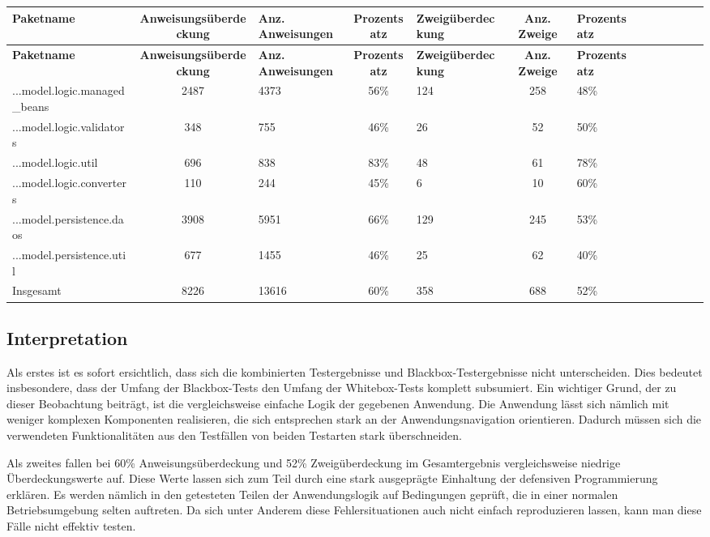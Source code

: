 \documentclass{article}
\begin{document}
\begin{longtable}{@{}lclclclclclcl@{}}
\toprule
\textbf{Paketname} & \textbf{Anweisungsüberdeckung} & \textbf{Anz. Anweisungen} & \textbf{Prozentsatz} & \textbf{Zweigüberdeckung} & \textbf{Anz. Zweige} & \textbf{Prozentsatz} \\* \midrule
\endfirsthead
\textbf{Paketname} & \textbf{Anweisungsüberdeckung} & \textbf{Anz. Anweisungen} & \textbf{Prozentsatz} & \textbf{Zweigüberdeckung} & \textbf{Anz. Zweige} & \textbf{Prozentsatz} \\* \midrule
\endhead
...model.logic.managed\_beans 	& 2487 		& 4373 		& 56\% 		& 124 		& 258 		& 48\% \\
...model.logic.validators 		& 348 		& 755 		& 46\% 		& 26 			& 52 			& 50\% \\
...model.logic.util 			& 696 		& 838 		& 83\% 		& 48 			& 61 			& 78\% \\
...model.logic.converters 		& 110 		& 244 		& 45\% 		& 6 			& 10 			& 60\% \\
...model.persistence.daos 		& 3908 		& 5951 		& 66\% 		& 129 		& 245 		& 53\% \\
...model.persistence.util 		& 677 		& 1455 		& 46\% 		& 25 			& 62 			& 40\% \\
Insgesamt 						& 8226            	& 13616            & 60\%            	& 358            	& 688            	& 52\% \\* \bottomrule
\end{longtable}

\subsection{Interpretation}

Als erstes ist es sofort ersichtlich, dass sich die kombinierten Testergebnisse und Blackbox-Testergebnisse nicht unterscheiden. 
Dies bedeutet insbesondere, dass der Umfang der Blackbox-Tests den Umfang der Whitebox-Tests komplett subsumiert. 
Ein wichtiger Grund, der zu dieser Beobachtung beiträgt, ist die vergleichsweise einfache Logik der gegebenen Anwendung. 
Die Anwendung lässt sich nämlich mit weniger komplexen Komponenten realisieren, die sich entsprechen stark an der Anwendungsnavigation orientieren. 
Dadurch müssen sich die verwendeten Funktionalitäten aus den Testfällen von beiden Testarten stark überschneiden.

Als zweites fallen bei 60\% Anweisungsüberdeckung und 52\% Zweigüberdeckung im Gesamtergebnis vergleichsweise niedrige Überdeckungswerte auf. 
Diese Werte lassen sich zum Teil durch eine stark ausgeprägte Einhaltung der defensiven Programmierung erklären. 
Es werden nämlich in den getesteten Teilen der Anwendungslogik auf Bedingungen geprüft, die in einer normalen Betriebsumgebung selten auftreten. 
Da sich unter Anderem diese Fehlersituationen auch nicht einfach reproduzieren lassen, kann man diese Fälle nicht effektiv testen. 

\newpage
\end{document}
